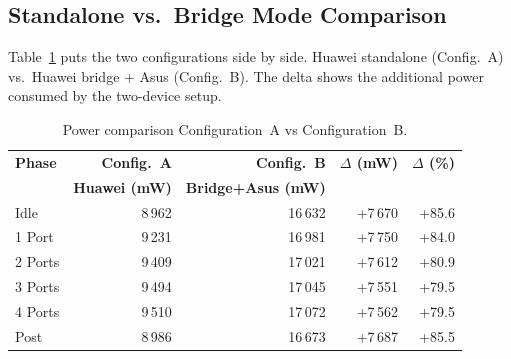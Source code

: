 \subsection{Standalone vs.\ Bridge Mode Comparison}
\label{sec:results-bridge-comparison}

Table~\ref{tab:bridge_comparison} puts the two configurations side by side. Huawei standalone (Config.~A) vs.\ Huawei bridge + Asus (Config.~B). The delta shows the additional power consumed by the two-device setup.

\begin{table}[H]
    \centering
    \caption{Power comparison Configuration~A vs Configuration~B.}
    \label{tab:bridge_comparison}
    \small\renewcommand{\arraystretch}{0.88}
    \begin{tabular}{l r r r r}
        \toprule
        \textbf{Phase} & \textbf{Config.~A} & \textbf{Config.~B} & \textbf{$\Delta$ (mW)} & \textbf{$\Delta$ (\%)} \\
                       & \textbf{Huawei (mW)} & \textbf{Bridge+Asus (mW)} & & \\
        \midrule
        Idle    & 8\,962  & 16\,632 & +7\,670 & +85.6 \\
        1 Port  & 9\,231  & 16\,981 & +7\,750 & +84.0 \\
        2 Ports & 9\,409  & 17\,021 & +7\,612 & +80.9 \\
        3 Ports & 9\,494  & 17\,045 & +7\,551 & +79.5 \\
        4 Ports & 9\,510  & 17\,072 & +7\,562 & +79.5 \\
        Post    & 8\,986  & 16\,673 & +7\,687 & +85.5 \\
        \bottomrule
    \end{tabular}
\end{table}

